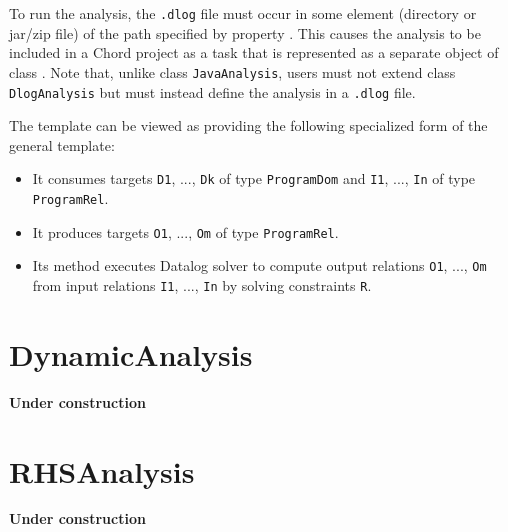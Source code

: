 To run the analysis, the {\tt .dlog} file must occur in some element (directory
or jar/zip file) of the path specified by property .
 This causes the analysis to be included in a Chord project as a task that is
represented as a separate object of class
.
Note that, unlike class {\tt JavaAnalysis}, users must not extend class
{\tt DlogAnalysis} but must instead define the analysis in a {\tt .dlog} file.

The  template can be viewed as providing the following
specialized form of the general  template:
\begin{itemize}
\item
It consumes targets {\tt D1}, ..., {\tt Dk} of type {\tt ProgramDom} and
{\tt I1}, ..., {\tt In} of type {\tt ProgramRel}.
\item
It produces targets {\tt O1}, ..., {\tt Om} of type {\tt ProgramRel}.
\item
Its  method executes Datalog solver  to compute output
relations {\tt O1}, ..., {\tt Om} from input relations {\tt I1}, ..., {\tt In}
by solving constraints {\tt R}.
\end{itemize}

\section{DynamicAnalysis}
\label{sec:dynamic}

{\bf Under construction}

\section{RHSAnalysis}
\label{sec:rhs}

{\bf Under construction}

